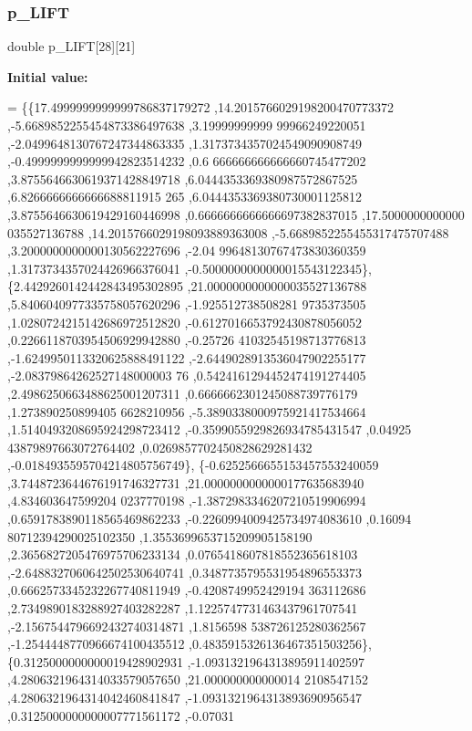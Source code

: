 \subsubsection{\texorpdfstring{p\+\_\+\+L\+I\+FT}{p\_LIFT}}
{\footnotesize\ttfamily double p\+\_\+\+L\+I\+FT\mbox{[}28\mbox{]}\mbox{[}21\mbox{]}}

{\bfseries Initial value\+:}
\begin{DoxyCode}
= \{\{17.4999999999999786837179272 ,14.2015766029198200470773372 ,-5.6689852255454873386497638 ,3.19999999999
      99966249220051 ,-2.0499648130767247344863335 ,1.3173734357024549090908749 ,-0.4999999999999942823514232 ,0.6
      666666666666660745477202 ,3.8755646630619371428849718 ,6.0444353369380987572867525 ,6.8266666666666688811915
      265 ,6.0444353369380730001125812 ,3.8755646630619429160446998 ,0.6666666666666697382837015 ,17.5000000000000
      035527136788 ,14.2015766029198093889363008 ,-5.6689852255455317475707488 ,3.2000000000000130562227696 ,-2.04
      99648130767473830360359 ,1.3173734357024426966376041 ,-0.5000000000000015543122345\},
\{2.4429260142442843495302895 ,21.0000000000000035527136788 ,5.8406040977335758057620296 ,-1.925512738508281
      9735373505 ,1.0280724215142686972512820 ,-0.6127016653792430878056052 ,0.2266118703954506929942880 ,-0.25726
      41032545198713776813 ,-1.6249950113320625888491122 ,-2.6449028913536047902255177 ,-2.08379864262527148000003
      76 ,0.5424161294452474191274405 ,2.4986250663488625001207311 ,0.6666662301245088739776179 ,1.273890250899405
      6628210956 ,-5.3890338000975921417534664 ,1.5140493208695924298723412 ,-0.3599055929826934785431547 ,0.04925
      43879897663072764402 ,0.0269857702450828629281432 ,-0.0184935595704214805756749\},
\{-0.6252566655153457553240059 ,3.7448723644676191746327731 ,21.0000000000000177635683940 ,4.834603647599204
      0237770198 ,-1.3872983346207210519906994 ,0.6591783890118565469862233 ,-0.2260994009425734974083610 ,0.16094
      80712394290025102350 ,1.3553699653715209905158190 ,2.3656827205476975706233134 ,0.0765418607818552365618103 
      ,-2.6488327060642502530640741 ,0.3487735795531954896553373 ,0.6662573345232267740811949 ,-0.4208749952429194
      363112686 ,2.7349890183288927403282287 ,1.1225747731463437961707541 ,-2.1567544796692432740314871 ,1.8156598
      538726125280362567 ,-1.2544448770966674100435512 ,0.4835915326136467351503256\},
\{0.3125000000000019428902931 ,-1.0931321964313895911402597 ,4.2806321964314033579057650 ,21.000000000000014
      2108547152 ,4.2806321964314042460841847 ,-1.0931321964313893690956547 ,0.3125000000000007771561172 ,-0.07031

\end{DoxyCode}
